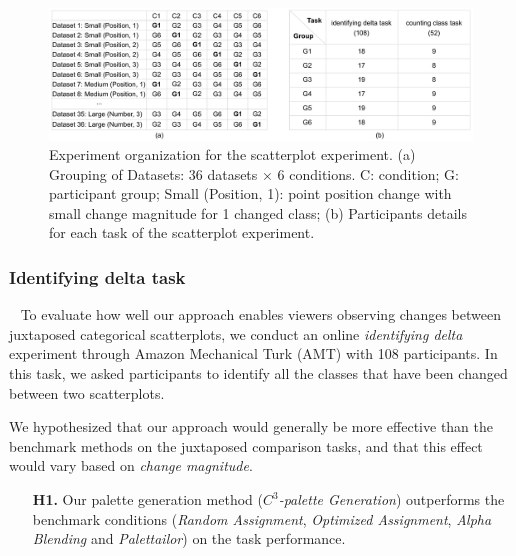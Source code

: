 {\begin{figure}[h]
\centering
\includegraphics[width=1\linewidth]{figures/experiment-organization.pdf}
\caption{Experiment organization for the scatterplot experiment. (a) Grouping of Datasets: $36$ datasets $\times$ $6$ conditions. C: condition; G: participant group; Small (Position, 1): point position change with small change magnitude for 1 changed class; (b) Participants details for each task of the scatterplot experiment.}
\vspace*{-3mm}
\label{fig:experimentOrgan}
\end{figure}

\subsubsection{Identifying delta task}
\
\newline
To evaluate how well our approach enables viewers observing changes between juxtaposed categorical scatterplots, we conduct an online \emph{identifying delta} experiment through Amazon Mechanical Turk (AMT) with 108 participants.
In this task, we asked participants to identify all the classes that have been changed between two scatterplots.

\vspace{.3em}
 We hypothesized that our approach would generally be more effective than the benchmark methods on the juxtaposed comparison tasks, and that this effect would vary based on \emph{change magnitude}.
\begin{itemize}[noitemsep]
\setlength{\itemsep}{5pt}
    \item[\textbf{H1.}] Our palette generation method (\emph{$C^3$-palette Generation}) outperforms the benchmark conditions (\emph{Random Assignment}, \emph{Optimized Assignment}, \emph{Alpha Blending} and \emph{Palettailor}) on the task performance.


\end{itemize}}
